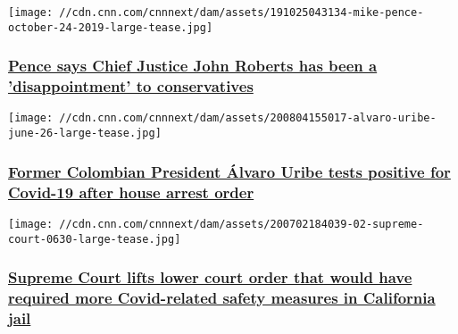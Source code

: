 \href{/2020/08/06/politics/pence-john-roberts-conservatives/index.html}{}

\texttt{[image: //cdn.cnn.com/cnnnext/dam/assets/191025043134-mike-pence-october-24-2019-large-tease.jpg]}

\hypertarget{pence-says-chief-justice-john-roberts-has-been-a-disappointment-to-conservatives}{%
\subsubsection{\texorpdfstring{\href{/2020/08/06/politics/pence-john-roberts-conservatives/index.html}{Pence
says Chief Justice John Roberts has been a 'disappointment' to
conservatives}}{Pence says Chief Justice John Roberts has been a 'disappointment' to conservatives}}\label{pence-says-chief-justice-john-roberts-has-been-a-disappointment-to-conservatives}}

\href{/2020/08/05/americas/colombia-uribe-detention-intl/index.html}{}

\texttt{[image: //cdn.cnn.com/cnnnext/dam/assets/200804155017-alvaro-uribe-june-26-large-tease.jpg]}

\hypertarget{former-colombian-president-uxe1lvaro-uribe-tests-positive-for-covid-19-after-house-arrest-order}{%
\subsubsection{\texorpdfstring{\href{/2020/08/05/americas/colombia-uribe-detention-intl/index.html}{Former
Colombian President Álvaro Uribe tests positive for Covid-19 after house
arrest
order}}{Former Colombian President Álvaro Uribe tests positive for Covid-19 after house arrest order}}\label{former-colombian-president-uxe1lvaro-uribe-tests-positive-for-covid-19-after-house-arrest-order}}

\href{/2020/08/05/politics/supreme-court-covid-measures-california-jail/index.html}{}

\texttt{[image: //cdn.cnn.com/cnnnext/dam/assets/200702184039-02-supreme-court-0630-large-tease.jpg]}

\hypertarget{supreme-court-lifts-lower-court-order-that-would-have-required-more-covid-related-safety-measures-in-california-jail}{%
\subsubsection{\texorpdfstring{\href{/2020/08/05/politics/supreme-court-covid-measures-california-jail/index.html}{Supreme
Court lifts lower court order that would have required more
Covid-related safety measures in California
jail}}{Supreme Court lifts lower court order that would have required more Covid-related safety measures in California jail}}\label{supreme-court-lifts-lower-court-order-that-would-have-required-more-covid-related-safety-measures-in-california-jail}}

